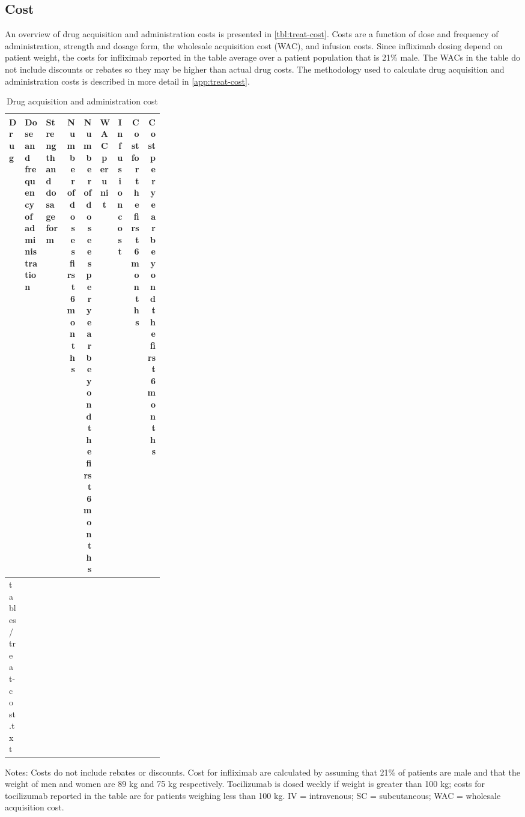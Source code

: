 \documentclass[11pt,final,fleqn]{article}\usepackage[]{graphicx}\usepackage[]{color}
\makeatletter
\theoremstyle{plain}
\newcommand*\ExpandableInput[1]{\@@input#1 }
\makeatother
\begin{document}
\FloatBarrier

\subsection{Cost}\label{cost}


An overview of drug acquisition and administration costs is presented in \autoref{tbl:treat-cost}. Costs are a function of dose and frequency of administration, strength and dosage form, the wholesale acquisition cost (WAC), and infusion costs. Since infliximab dosing depend on patient weight, the costs for infliximab reported in the table average over a patient population that is 21\% male. The WACs in the table do not include discounts or rebates so they may be higher than actual drug costs. The methodology used to calculate drug acquisition and administration costs is described in more detail in \autoref{app:treat-cost}.

\begin{table}
\begin{center}
\begin{threeparttable}
\caption{Drug acquisition and administration cost} \label{tbl:treat-cost}
\scriptsize
\begin{tabular}{lp{0.15\linewidth}p{0.15\linewidth}rrrrrr}
\hline
\multicolumn{1}{l}{Drug} &
\multicolumn{1}{p{0.15\linewidth}}{Dose and frequency of administration} & 
\multicolumn{1}{p{0.15\linewidth}}{Strength and dosage form} & 
\multicolumn{1}{p{0.08\linewidth}}{Number of doses first 6 months}  & 
\multicolumn{1}{p{0.08\linewidth}}{Number of dosees per year beyond the first 6 months} & 
\multicolumn{1}{c}{WAC per unit} & \multicolumn{1}{c}{Infusion cost} & 
\multicolumn{1}{p{0.08\linewidth}}{Cost for the first 6 months} &
\multicolumn{1}{p{0.08\linewidth}}{Cost per year beyond the first 6 months}\\
\hline
\ExpandableInput{tables/treat-cost.txt}
\hline
\end{tabular}
\tiny
Notes: Costs do not include rebates or discounts. Cost for infliximab are calculated by assuming that 21\% of patients are male and that the weight of men and women are 89 kg and 75 kg respectively. Tocilizumab is dosed weekly if weight is greater than 100 kg; costs for tocilizumab reported in the table are for patients weighing less than 100 kg. IV = intravenous; SC = subcutaneous; WAC = wholesale acquisition cost. 
\end{threeparttable}
\end{center}
\end{table}
\end{document}
